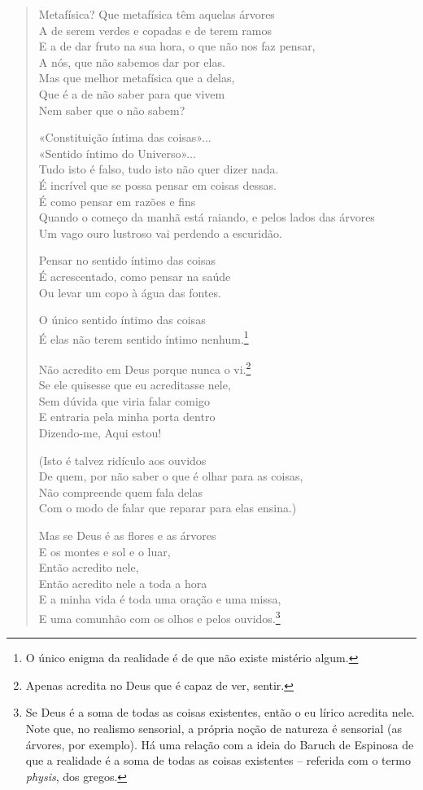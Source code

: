 \begin{verse}
Metafísica? Que metafísica têm aquelas árvores \\
A de serem verdes e copadas e de terem ramos \\
E a de dar fruto na sua hora, o que não nos faz pensar, \\
A nós, que não sabemos dar por elas. \\
Mas que melhor metafísica que a delas, \\
Que é a de não saber para que vivem \\
Nem saber que o não sabem?

«Constituição íntima das coisas»... \\
«Sentido íntimo do Universo»... \\
Tudo isto é falso, tudo isto não quer dizer nada. \\
É incrível que se possa pensar em coisas dessas. \\
É como pensar em razões e fins \\
Quando o começo da manhã está raiando, e pelos lados das árvores \\
Um vago ouro lustroso vai perdendo a escuridão.

Pensar no sentido íntimo das coisas \\
É acrescentado, como pensar na saúde \\
Ou levar um copo à água das fontes.

O único sentido íntimo das coisas \\
É elas não terem sentido íntimo nenhum.\footnote{O único enigma da realidade é de que não existe mistério algum.}

Não acredito em Deus porque nunca o vi.\footnote{Apenas acredita no Deus que é capaz de ver, sentir.} \\
Se ele quisesse que eu acreditasse nele, \\
Sem dúvida que viria falar comigo \\
E entraria pela minha porta dentro \\
Dizendo-me, Aqui estou!

(Isto é talvez ridículo aos ouvidos \\
De quem, por não saber o que é olhar para as coisas, \\
Não compreende quem fala delas \\
Com o modo de falar que reparar para elas ensina.)

Mas se Deus é as flores e as árvores \\
E os montes e sol e o luar, \\
Então acredito nele, \\
Então acredito nele a toda a hora \\
E a minha vida é toda uma oração e uma missa, \\
E uma comunhão com os olhos e pelos ouvidos.\footnote{Se Deus é a soma de todas as coisas existentes, então o eu lírico acredita nele. Note que, no realismo sensorial, a própria noção de natureza é sensorial (as árvores, por exemplo). Há uma relação com a ideia do Baruch de Espinosa de que a realidade é a soma de todas as coisas existentes -- referida com o termo \textit{physis}, dos gregos.}


\end{verse}
